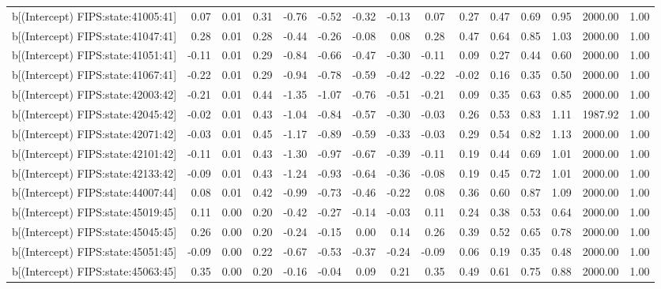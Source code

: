 \begin{table}[ht]
\begin{tabular}{rrrrrrrrrrrrrrr}
  b[(Intercept) FIPS:state:41005:41] & 0.07 & 0.01 & 0.31 & -0.76 & -0.52 & -0.32 & -0.13 & 0.07 & 0.27 & 0.47 & 0.69 & 0.95 & 2000.00 & 1.00 \\ 
  b[(Intercept) FIPS:state:41047:41] & 0.28 & 0.01 & 0.28 & -0.44 & -0.26 & -0.08 & 0.08 & 0.28 & 0.47 & 0.64 & 0.85 & 1.03 & 2000.00 & 1.00 \\ 
  b[(Intercept) FIPS:state:41051:41] & -0.11 & 0.01 & 0.29 & -0.84 & -0.66 & -0.47 & -0.30 & -0.11 & 0.09 & 0.27 & 0.44 & 0.60 & 2000.00 & 1.00 \\ 
  b[(Intercept) FIPS:state:41067:41] & -0.22 & 0.01 & 0.29 & -0.94 & -0.78 & -0.59 & -0.42 & -0.22 & -0.02 & 0.16 & 0.35 & 0.50 & 2000.00 & 1.00 \\ 
  b[(Intercept) FIPS:state:42003:42] & -0.21 & 0.01 & 0.44 & -1.35 & -1.07 & -0.76 & -0.51 & -0.21 & 0.09 & 0.35 & 0.63 & 0.85 & 2000.00 & 1.00 \\ 
  b[(Intercept) FIPS:state:42045:42] & -0.02 & 0.01 & 0.43 & -1.04 & -0.84 & -0.57 & -0.30 & -0.03 & 0.26 & 0.53 & 0.83 & 1.11 & 1987.92 & 1.00 \\ 
  b[(Intercept) FIPS:state:42071:42] & -0.03 & 0.01 & 0.45 & -1.17 & -0.89 & -0.59 & -0.33 & -0.03 & 0.29 & 0.54 & 0.82 & 1.13 & 2000.00 & 1.00 \\ 
  b[(Intercept) FIPS:state:42101:42] & -0.11 & 0.01 & 0.43 & -1.30 & -0.97 & -0.67 & -0.39 & -0.11 & 0.19 & 0.44 & 0.69 & 1.01 & 2000.00 & 1.00 \\ 
  b[(Intercept) FIPS:state:42133:42] & -0.09 & 0.01 & 0.43 & -1.24 & -0.93 & -0.64 & -0.36 & -0.08 & 0.19 & 0.45 & 0.72 & 1.01 & 2000.00 & 1.00 \\ 
  b[(Intercept) FIPS:state:44007:44] & 0.08 & 0.01 & 0.42 & -0.99 & -0.73 & -0.46 & -0.22 & 0.08 & 0.36 & 0.60 & 0.87 & 1.09 & 2000.00 & 1.00 \\ 
  b[(Intercept) FIPS:state:45019:45] & 0.11 & 0.00 & 0.20 & -0.42 & -0.27 & -0.14 & -0.03 & 0.11 & 0.24 & 0.38 & 0.53 & 0.64 & 2000.00 & 1.00 \\ 
  b[(Intercept) FIPS:state:45045:45] & 0.26 & 0.00 & 0.20 & -0.24 & -0.15 & 0.00 & 0.14 & 0.26 & 0.39 & 0.52 & 0.65 & 0.78 & 2000.00 & 1.00 \\ 
  b[(Intercept) FIPS:state:45051:45] & -0.09 & 0.00 & 0.22 & -0.67 & -0.53 & -0.37 & -0.24 & -0.09 & 0.06 & 0.19 & 0.35 & 0.48 & 2000.00 & 1.00 \\ 
  b[(Intercept) FIPS:state:45063:45] & 0.35 & 0.00 & 0.20 & -0.16 & -0.04 & 0.09 & 0.21 & 0.35 & 0.49 & 0.61 & 0.75 & 0.88 & 2000.00 & 1.00 \\ 

\end{tabular}
\end{table}
